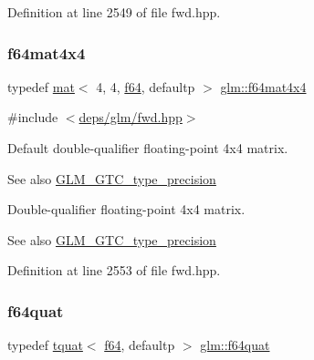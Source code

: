 Definition at line 2549 of file fwd.\+hpp.

\mbox{\label{group__gtc__type__precision_ga5fc21633b1546e4599609c47b4c8dac4}} 
\subsubsection{\texorpdfstring{f64mat4x4}{f64mat4x4}}
{\footnotesize\ttfamily typedef \hyperlink{structglm_1_1mat}{mat}$<$ 4, 4, \hyperlink{group__gtc__type__precision_ga2bba392e555124b36cde6abba349bab3}{f64}, defaultp $>$ \hyperlink{group__gtc__type__precision_ga5fc21633b1546e4599609c47b4c8dac4}{glm\+::f64mat4x4}}



{\ttfamily \#include $<$\hyperlink{fwd_8hpp}{deps/glm/fwd.\+hpp}$>$}

Default double-\/qualifier floating-\/point 4x4 matrix. \begin{DoxySeeAlso}{See also}
\hyperlink{group__gtc__type__precision}{G\+L\+M\+\_\+\+G\+T\+C\+\_\+type\+\_\+precision}
\end{DoxySeeAlso}
Double-\/qualifier floating-\/point 4x4 matrix. \begin{DoxySeeAlso}{See also}
\hyperlink{group__gtc__type__precision}{G\+L\+M\+\_\+\+G\+T\+C\+\_\+type\+\_\+precision} 
\end{DoxySeeAlso}


Definition at line 2553 of file fwd.\+hpp.

\mbox{\label{group__gtc__type__precision_ga5b54d7b36fbee5e271f73e6ed74e7172}} 
\subsubsection{\texorpdfstring{f64quat}{f64quat}}
{\footnotesize\ttfamily typedef \hyperlink{structglm_1_1tquat}{tquat}$<$ \hyperlink{group__gtc__type__precision_ga2bba392e555124b36cde6abba349bab3}{f64}, defaultp $>$ \hyperlink{group__gtc__type__precision_ga5b54d7b36fbee5e271f73e6ed74e7172}{glm\+::f64quat}}



